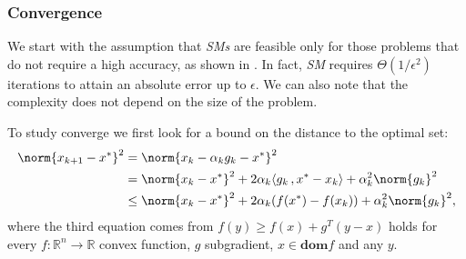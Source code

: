 
\subsubsection{Convergence}
We start with the assumption that \textit{SMs} are feasible only for those problems that do not require a high accuracy, as shown in \cite{subgrad_fra}. In fact, \textit{SM} requires $\Theta (1/\epsilon^2)$ iterations to attain an absolute error up to $\epsilon$. We can also note that the complexity does not depend on the size of the problem.

To study converge we first look for a bound on the distance to the optimal set:
\begin{align}
    \begin{split}
        \norm{x_{k+1} - x^*}^2 & = \norm{x_k - \alpha_kg_k - x^*}^2\\
        & = \norm{x_k - x^*}^2 + 2\alpha_k\langle g_k\,,x^* - x_k\rangle + \alpha_k^2\norm{g_k}^2 \\
        & \leq \norm{x_k - x^*}^2 + 2\alpha_k(f(x^*) - f(x_k)) + \alpha_k^2\norm{g_k}^2,
        \label{proof:subsecond}
    \end{split}
\end{align}
where the third equation comes from $f(y) \geq f(x) + g^T(y-x)$ holds for every $f:\mathbb{R}^n\to\mathbb{R}$ convex function, $g$ subgradient, $x\in \mathbf{dom}f$ and any $y$.

